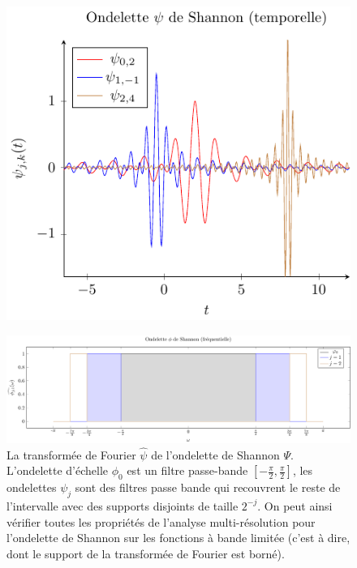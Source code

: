 \begin{figure}
	{\includegraphics{Figs/shannonspat}}
\end{figure}
\begin{figure}
	\includegraphics[width=17cm]{Figs/shannonfreq}
	\caption{La transformée de Fourier $\hat{\psi}$ de l'ondelette de Shannon $\Psi$. L'ondelette d'échelle $\phi_0$ est un filtre passe-bande $[-\frac{\pi}{2}, \frac{\pi}{2}]$, les ondelettes $ \psi_j$ sont des filtres passe bande qui recouvrent le reste de l'intervalle avec des supports disjoints de taille $2^{-j}$. On peut ainsi vérifier toutes les propriétés de l'analyse multi-résolution pour l'ondelette de Shannon sur les fonctions à bande limitée (c'est à dire, dont le support de la transformée de Fourier est borné).
	}
\end{figure}
